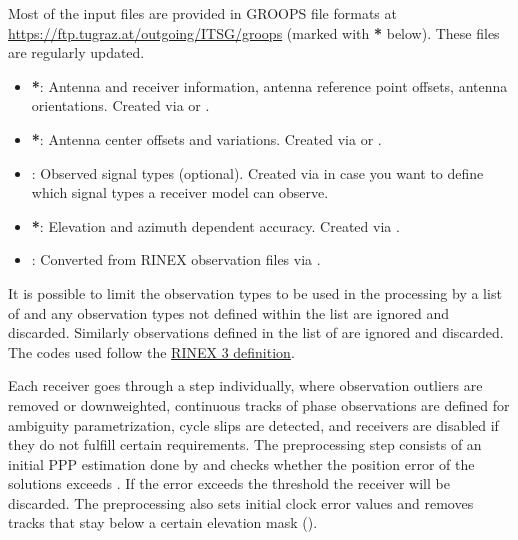 Most of the input files are provided in GROOPS file formats at
\url{https://ftp.tugraz.at/outgoing/ITSG/groops} (marked with \textbf{*} below).
These files are regularly updated.
\begin{itemize}
  \item {}\textbf{*}:
        Antenna and receiver information, antenna reference point offsets, antenna orientations.
        Created via  or .
  \item {}\textbf{*}:
        Antenna center offsets and variations.
        Created via  or .
  \item {}:
        Observed signal types (optional).
        Created via  in case you want to define which signal
        types a receiver model can observe.
  \item {}\textbf{*}:
        Elevation and azimuth dependent accuracy.
        Created via .
  \item {}:
        Converted from RINEX observation files via .
\end{itemize}

It is possible to limit the observation types to be used in the processing by a list of 
and any observation types not defined within the list are ignored and discarded.
Similarly observations defined in the list of  are ignored and discarded.
The codes used follow the \href{https://files.igs.org/pub/data/format/rinex305.pdf}{RINEX 3 definition}.

Each receiver goes through a  step individually, where observation outliers are removed or downweighted,
continuous tracks of phase observations are defined for ambiguity parametrization, cycle slips are detected, and receivers are
disabled if they do not fulfill certain requirements. The preprocessing step consists of an initial PPP estimation done by
 and checks whether the position error
of the solutions exceeds . If the error exceeds the threshold the receiver will be discarded.
The preprocessing also sets initial clock error values and removes tracks that stay below a certain elevation mask ().

